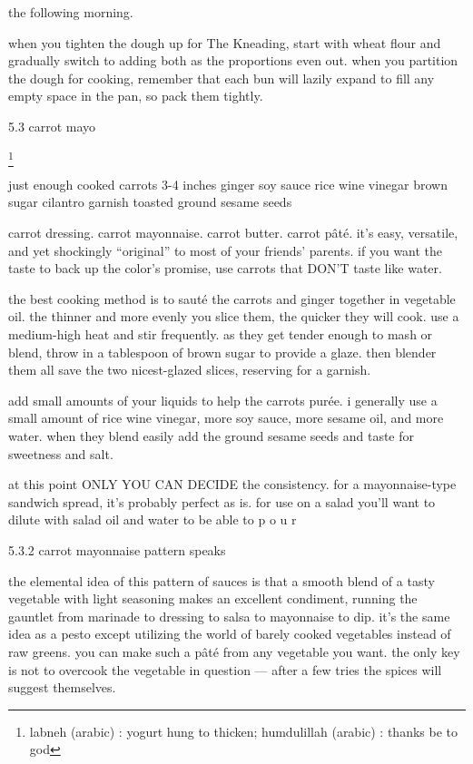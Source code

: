 the following morning.

when you tighten the dough up for The Kneading, start with wheat flour and gradually switch to adding both as the proportions even out.
when you partition the dough for cooking, remember that each bun will lazily expand to fill any empty space in the pan, so pack them tightly.

5.3  carrot mayo

\footnote{labneh (arabic) : yogurt hung to thicken;   humdulillah (arabic) : thanks be to god}

just enough cooked carrots
3-4 inches ginger
soy sauce
rice wine vinegar
brown sugar
cilantro garnish
toasted ground sesame seeds

carrot dressing. carrot mayonnaise. carrot butter. carrot p\^{a}t\'{e}. it's easy, versatile, and yet shockingly ``original'' to most of your friends' parents. if you want the taste to back up the color's promise, use carrots that DON'T taste like water.

the best cooking method is to saut\'{e} the carrots and ginger together in vegetable oil. the thinner and more evenly you slice them, the quicker they will cook. use a medium-high heat and stir frequently. as they get tender enough to mash or blend, throw in a tablespoon of brown sugar to provide a glaze. then blender them all save the two nicest-glazed slices, reserving for a garnish. 

add small amounts of your liquids to help the carrots pur\'{e}e. i generally use a small amount of rice wine vinegar, more soy sauce, more sesame oil, and more water. when they blend easily add the ground sesame seeds and taste for sweetness and salt.

at this point ONLY YOU CAN DECIDE the consistency. for a mayonnaise-type sandwich spread, it's probably perfect as is. for use on a salad you'll want to dilute with salad oil and water to be able to
p
  o
   u
   r

5.3.2  carrot mayonnaise pattern speaks

the elemental idea of this pattern of sauces is that a smooth blend of a tasty vegetable with light seasoning makes an excellent condiment, running the gauntlet from marinade to dressing to salsa to mayonnaise to dip. it's the same idea as a pesto except utilizing the world of barely cooked vegetables instead of raw greens. you can make such a p\^{a}t\'{e} from any vegetable you want. the only key is not to overcook the vegetable in question --- after a few tries the spices will suggest themselves.

